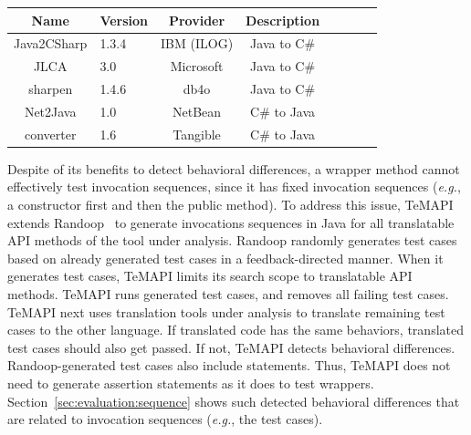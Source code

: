 \label{sec:approach:sequence}
\begin{table}[t]
\centering
\begin{SmallOut}
\begin {tabular} {|c|l|c|c|c|c|c|c|}
\hline
\textbf{Name}& \textbf{Version}& \textbf{Provider} &\textbf{Description}\\
\hline
Java2CSharp  &  1.3.4 & IBM (ILOG) & Java to C\# \\
\hline
JLCA         &  3.0   & Microsoft  & Java to C\# \\
\hline
sharpen      &  1.4.6 & db4o       & Java to C\# \\
\hline
Net2Java     &  1.0   & NetBean    &  C\# to Java\\
\hline
converter    &  1.6   & Tangible   &  C\# to Java\\
\hline
\end{tabular}\vspace*{-2ex}
 \label{table:subjects}
\end{SmallOut}\vspace*{-4ex}
\end{table}

Despite of its benefits to detect behavioral differences, a wrapper method cannot effectively test invocation sequences, since it has fixed invocation sequences (\emph{e.g.}, a constructor first and then the public method). To address this issue, TeMAPI extends Randoop~\cite{pacheco2007feedback} to generate invocations sequences in Java for all translatable API methods of the tool under analysis. Randoop randomly generates test cases based on already generated test cases in a feedback-directed manner. When it generates test cases, TeMAPI limits its search scope to translatable API methods.  TeMAPI runs generated test cases, and removes all failing test cases. TeMAPI next uses translation tools under analysis to translate remaining test cases to the other language. If translated code has the same behaviors, translated test cases should also get passed. If not, TeMAPI detects behavioral differences. Randoop-generated test cases also include  statements. Thus, TeMAPI does not need to generate assertion statements as it does to test wrappers. Section~\ref{sec:evaluation:sequence} shows such detected behavioral differences that are related to invocation sequences (\emph{e.g.}, the  test cases). 